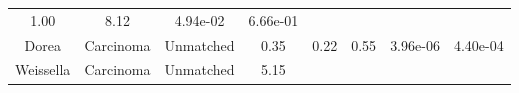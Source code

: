 \documentclass[12pt,]{article}
\begin{document}
\begin{longtable}[]{@{}cccccccc@{}}
\begin{minipage}[t]{0.13\columnwidth}
1.00\strut
\end{minipage} & \begin{minipage}[t]{0.13\columnwidth}\centering\strut
8.12\strut
\end{minipage} & \begin{minipage}[t]{0.07\columnwidth}\centering\strut
4.94e-02\strut
\end{minipage} & \begin{minipage}[t]{0.07\columnwidth}\centering\strut
6.66e-01\strut
\end{minipage}\tabularnewline
\begin{minipage}[t]{0.16\columnwidth}\centering\strut
Dorea\strut
\end{minipage} & \begin{minipage}[t]{0.08\columnwidth}\centering\strut
Carcinoma\strut
\end{minipage} & \begin{minipage}[t]{0.09\columnwidth}\centering\strut
Unmatched\strut
\end{minipage} & \begin{minipage}[t]{0.05\columnwidth}\centering\strut
0.35\strut
\end{minipage} & \begin{minipage}[t]{0.13\columnwidth}\centering\strut
0.22\strut
\end{minipage} & \begin{minipage}[t]{0.13\columnwidth}\centering\strut
0.55\strut
\end{minipage} & \begin{minipage}[t]{0.07\columnwidth}\centering\strut
3.96e-06\strut
\end{minipage} & \begin{minipage}[t]{0.07\columnwidth}\centering\strut
4.40e-04\strut
\end{minipage}\tabularnewline
\begin{minipage}[t]{0.16\columnwidth}\centering\strut
Weissella\strut
\end{minipage} & \begin{minipage}[t]{0.08\columnwidth}\centering\strut
Carcinoma\strut
\end{minipage} & \begin{minipage}[t]{0.09\columnwidth}\centering\strut
Unmatched\strut
\end{minipage} & \begin{minipage}[t]{0.05\columnwidth}\centering\strut
5.15\strut
\end{minipage} & \begin{minipage}[t]{0.13\columnwidth}\centering\strut

\end{minipage}
\end{longtable}
\end{document}
